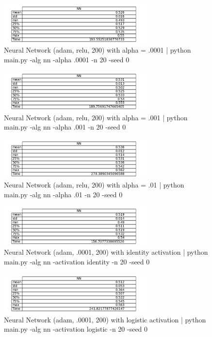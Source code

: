 \documentclass{article}
\begin{document}
\begin{figure}
\begin{center}
\includegraphics[width=8cm]{images/nn_0001}
\caption{Neural Network (adam, relu, 200) with alpha = .0001 | python main.py -alg nn -alpha .0001 -n 20 -seed 0}
\end{center}
\end{figure}
\begin{figure}
\begin{center}
\includegraphics[width=8cm]{images/nn_001}
\caption{Neural Network (adam, relu, 200) with alpha = .001 | python main.py -alg nn -alpha .001 -n 20 -seed 0}
\end{center}
\end{figure}
\begin{figure}
\begin{center}
\includegraphics[width=8cm]{images/nn_01}
\caption{Neural Network (adam, relu, 200) with alpha = .01 | python main.py -alg nn -alpha .01 -n 20 -seed 0}
\end{center}
\end{figure}
\begin{figure}
\begin{center}
\includegraphics[width=8cm]{images/nn_identity}
\caption{Neural Network (adam, .0001, 200) with identity activation | python main.py -alg nn -activation identity -n 20 -seed 0}
\end{center}
\end{figure}
\begin{figure}
\begin{center}
\includegraphics[width=8cm]{images/nn_logistic}
\caption{Neural Network (adam, .0001, 200) with logistic activation | python main.py -alg nn -activation logistic -n 20 -seed 0}
\end{center}
\end{figure}
\end{document}
